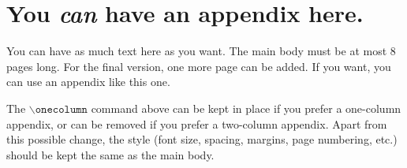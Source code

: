 \documentclass{article}
\theoremstyle{plain}
\theoremstyle{definition}
\theoremstyle{remark}
\begin{document}
\newpage
\appendix
\onecolumn
\section{You \emph{can} have an appendix here.}

You can have as much text here as you want. The main body must be at most $8$
pages long. For the final version, one more page can be added. If you want, you
can use an appendix like this one.

The $\mathtt{\backslash onecolumn}$ command above can be kept in place if you
prefer a one-column appendix, or can be removed if you prefer a two-column
appendix.  Apart from this possible change, the style (font size, spacing,
margins, page numbering, etc.) should be kept the same as the main body.
\end{document}
